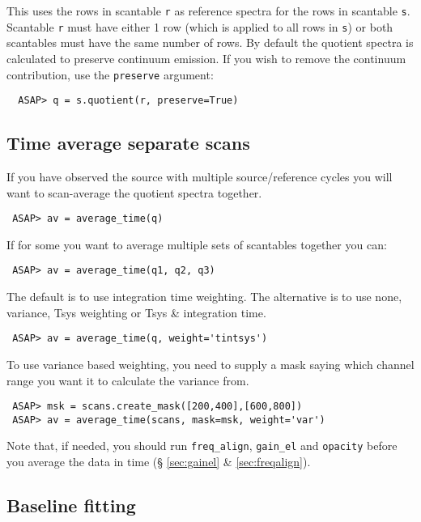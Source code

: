 \documentclass[11pt]{article}
\newcommand{\cmd}[1]{{\tt #1}}
\begin{document}
This uses the rows in scantable \cmd{r} as reference spectra for the
rows in scantable \cmd{s}. Scantable \cmd{r} must have either 1 row
(which is applied to all rows in \cmd{s}) or both scantables must have
the same number of rows. By default the quotient spectra is calculated
to preserve continuum emission. If you wish to remove the continuum
contribution, use the \cmd{preserve} argument:

\begin{verbatim}
  ASAP> q = s.quotient(r, preserve=True)
\end{verbatim}

\subsection{Time average separate scans}

If you have observed the source with multiple
source/reference cycles you will want to scan-average the quotient
spectra together.

\begin{verbatim}
 ASAP> av = average_time(q)
\end{verbatim}

If for some you want to average multiple sets of scantables together
you can:

\begin{verbatim}
 ASAP> av = average_time(q1, q2, q3)
\end{verbatim}

The default is to use integration time weighting. The alternative is
to use none, variance, Tsys weighting or Tsys \& integration time.

\begin{verbatim}
 ASAP> av = average_time(q, weight='tintsys')
\end{verbatim}

To use variance based weighting, you need to supply a mask saying which
channel range you want it to calculate the variance from.

\begin{verbatim}
 ASAP> msk = scans.create_mask([200,400],[600,800])
 ASAP> av = average_time(scans, mask=msk, weight='var')
\end{verbatim}

Note that, if needed, you should run \cmd{freq\_align}, \cmd{gain\_el}
and \cmd{opacity} before you average the data in time (\S
\ref{sec:gainel} \& \ref{sec:freqalign}).

\subsection{Baseline fitting}
\end{document}
